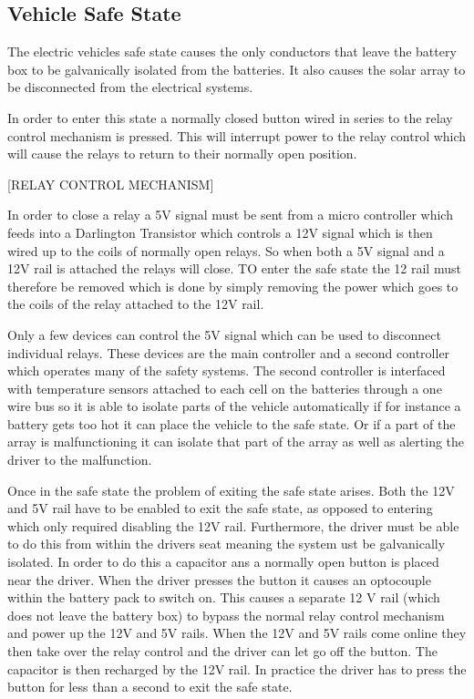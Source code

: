 \documentclass[10pt,a4paper]{article}
\begin{document}
\subsection{Vehicle Safe State}
The electric vehicles safe state causes the only conductors that leave the battery box to be galvanically isolated from the batteries. It also causes the solar array to be disconnected from the electrical systems. 

In order to enter this state a normally closed button wired in series to the relay control mechanism is pressed. This will interrupt power to the relay control which will cause the relays to return to their normally open position.

[RELAY CONTROL MECHANISM]

In order to close a relay a 5V signal must be sent from a micro controller which feeds into a Darlington Transistor which controls a 12V signal which is then wired up to the coils of normally open relays. So when both a 5V signal and a 12V rail is attached the relays will close. TO enter the safe state the 12 rail must therefore be removed which is done by simply removing the power which goes to the coils of the relay attached to the 12V rail.

Only a few devices can control the 5V signal which can be used to disconnect individual relays. These devices are the main controller and a second controller which operates many of the safety systems. The second controller is interfaced with temperature sensors attached to each cell on the batteries through a one wire bus so it is able to isolate parts of the vehicle automatically if for instance a battery gets too hot it can place the vehicle to the safe state. Or if a part of the array is malfunctioning it can isolate that part of the array as well as alerting the driver to the malfunction.

Once in the safe state the problem of exiting the safe state arises. Both the 12V and 5V rail have to be enabled to exit the safe state, as opposed to entering which only required disabling the 12V rail. Furthermore, the driver must be able to do this from within the drivers seat meaning the system ust be galvanically isolated. In order to do this a capacitor ans a normally open button is placed near the driver. When the driver presses the button it causes an optocouple within the battery pack to switch on. This causes a separate 12 V rail (which does not leave the battery box) to bypass the normal relay control mechanism and power up the 12V and 5V rails. When the 12V and 5V rails come online they then take over the relay control and the driver can let go off the button. The capacitor is then recharged by the 12V rail. In practice the driver has to press the button for less than a second to exit the safe state. 
\end{document}

